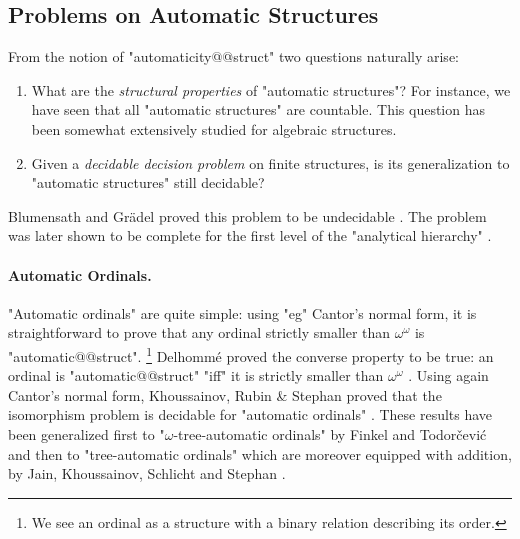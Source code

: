 \subsection{Problems on Automatic Structures}

From the notion of "automaticity@@struct" two questions naturally arise:
\begin{enumerate}
	\item What are the \emph{structural properties} of "automatic structures"?
		For instance, we have seen that all "automatic structures" are countable.
		This question has been somewhat extensively studied for algebraic structures.
	\item Given a \emph{decidable decision problem} on finite structures, is its generalization
		to "automatic structures" still decidable?
\end{enumerate}

Blumensath and Grädel proved this problem
to be undecidable \cite[Theorem~5.15]{BlumensathGradel2004FinitePresentations}.
The problem was later shown to be complete for the first level
of the "analytical hierarchy" \cite[Theorem~5.9]{KhoussainovNiesRubinStephan2007Automatic}.

\paragraph*{Automatic Ordinals.}
"Automatic ordinals" are quite simple: using "eg" Cantor's normal form, it is straightforward
to prove that any ordinal strictly smaller than $\omega^\omega$ is "automatic@@struct".%
\footnote{We see an ordinal as a structure with a binary relation describing its order.}
Delhommé proved the converse property to be true:
an ordinal is "automatic@@struct" "iff" it is strictly smaller than $\omega^\omega$
\cite[Corollaire~2.2]{Delhommé2004AutomaticitéOrdinaux}.
Using again Cantor's normal form,
Khoussainov, Rubin \& Stephan proved that the isomorphism problem is decidable for
"automatic ordinals" \cite[Theorem~5.3]{KhoussainovRubinStephan2005AutomaticLinearOrders}.
These results have been generalized first to "$\omega$-tree-automatic ordinals"
by Finkel and Todor\v{c}ević \cite{FinkelTodorcevic2013AutomaticOrdinals}
and then to "tree-automatic ordinals" which
are moreover equipped with addition, by Jain, Khoussainov, Schlicht and Stephan
\cite{JainKhoussainovSchlichtStephan2019IsomorphismTreeAutomaticOrdinals}.

